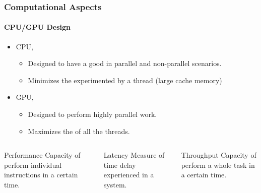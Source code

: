 \begin{frame}
    \frametitle{Computational Aspects}
    \framesubtitle{CPU/GPU Design}

    \begin{itemize}
        \item CPU,
        \begin{itemize}
            \item Designed to have a good 
                  in parallel and non-parallel scenarios.
            \item Minimizes the  experimented by a thread
                  (large cache memory)
        \end{itemize}
        \item GPU,
            \begin{itemize}
            \item Designed to perform highly parallel work.
            \item Maximizes the  of all the threads.
            \end{itemize}
    \end{itemize}

    \begin{footnotesize}
        \begin{columns}
            \begin{column}{0.35\textwidth}
            \begin{block}{Performance}
                Capacity of perform individual instructions in a certain time.
            \end{block}
            \end{column}
            \begin{column}{0.3\textwidth}
            \begin{block}{Latency}
                Measure of time delay experienced in a system.
            \end{block}
            \end{column}
            \begin{column}{0.3\textwidth}
            \begin{block}{Throughput}
                Capacity of perform a whole task in a certain time.
            \end{block}
            \end{column}
        \end{columns}
    \end{footnotesize}
\end{frame}

